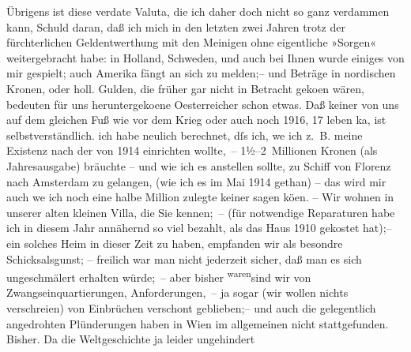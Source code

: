 \pstart
           Übrigens ist  diese verda{\geminationm}te Valuta, die ich daher doch nicht so ganz verdammen
               kann, \introOben{}Schuld daran\introOben{}, daß ich mich in den letzten zwei Jahren
               trotz der fürchterlichen Geldentwerthung mit den Meinigen ohne eigentliche »Sorgen«
               weitergebracht habe: in Holland, Schweden, und auch bei Ihnen wurde einiges von
               mir gespielt; auch Amerika fängt an sich zu
               melden;– und  Beträge in nordischen Kronen, oder holl. Gulden, die früher gar nicht in Betracht geko{\geminationm}en {\pb}wären, bedeuten
               für uns heruntergeko{\geminationm}ene Oesterreicher schon etwas. Daß keiner von uns auf dem gleichen
               Fuß wie vor dem Krieg oder auch noch 1916, 17 leben ka{\geminationn}, ist selbstverständlich. ich habe neulich berechnet,
               dſs ich, we{\geminationn} ich z. B. meine Existenz nach  der von 1914 einrichten wollte, –
               1½–2 Millionen Kronen \introOben{}(als Jahresausgabe)\introOben{} bräuchte – und wie
               ich es anstellen sollte, zu Schiff von Florenz
               nach Amsterdam zu gelangen, (wie ich es im
                  Mai 1914 gethan) – das wird mir \introOben{}auch we{\geminationn} ich noch eine halbe Million zulegte\introOben{} keiner
               sagen kö{\geminationn}en. – Wir wohnen  in unserer alten kleinen Villa, die Sie kennen; – (für notwendige
               Reparaturen habe ich in diesem Jahr annähernd so viel bezahlt, als das Haus
                  1910 gekostet hat);– ein solches Heim in dieser Zeit \introOben{}zu\introOben{} haben, empfanden wir als besondre Schicksalsgunst; –
               freilich  war man nicht jederzeit sicher, daß
               man es sich unge{\pb}schmälert erhalten würde; – aber
               bisher \substVorne{}\textsuperscript{waren}\substDazwischen{}sind\substHinten{} wir von Zwangseinquartierungen, Anforderungen, – ja sogar (wir wollen nichts
               verschreien) von Einbrüchen verschont geblieben;– und auch die gelegentlich
               angedrohten Plünderungen haben in Wien im
               allgemeinen nicht stattgefunden. Bisher. Da die Weltgeschichte ja leider ungehindert
